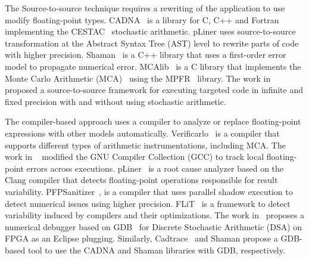 \documentclass[11pt]{article}
\begin{document}
The Source-to-source technique requires a rewriting of the application to use modify floating-point types.
CADNA~\cite{jezequel2008cadna} is a library for C, C++ and Fortran  implementing the CESTAC~\cite{vignes1993stochastic} stochastic arithmetic.
pLiner uses source-to-source transformation at the Abstract Syntax Tree (AST)  level to rewrite parts of code with higher precision. 
Shaman~\cite{demeure_phd} is a C++ library that uses a first-order error model to propagate numerical error. 
MCAlib~\cite{frechtling2015mcalib} is a C library that implements the Monte Carlo Arithmetic (MCA)~\cite{parker1997monte} using the MPFR~\cite{fousse2007mpfr} library.
The work in~\cite{tang2016software} proposed a source-to-source framework for executing targeted code in infinite and fixed precision with and without using stochastic arithmetic.

The compiler-based approach uses a compiler to analyze or replace floating-point expressions with other models automatically. 
Verificarlo~\cite{verificarlo} is a compiler that supports different types of arithmetic instrumentations, including MCA. 
The work in ~\cite{bao2013fly} modified the GNU Compiler Collection (GCC) to track local floating-point errors across executions. pLiner~\cite{guo2020pliner} is a root cause analyzer based on the Clang compiler that detects floating-point operations responsible for result variability. 
PFPSanitizer~\cite{chowdhary2020debugging,chowdhary2021parallel}, is a compiler that uses parallel shadow execution to detect numerical issues using higher precision.
FLiT~\cite{sawaya2017flit} is a framework to detect variability induced by compilers and their optimizations.
The work in~\cite{wang2012development} proposes a numerical debugger based on GDB~\cite{stallman1988debugging} for Discrete Stochastic Arithmetic (DSA) on FPGA as an Eclipse plugging. Similarly, Cadtrace~\cite{jezequel2008cadna} and Shaman propose a GDB-based tool to use the CADNA and Shaman libraries with GDB, respectively.
\end{document}
